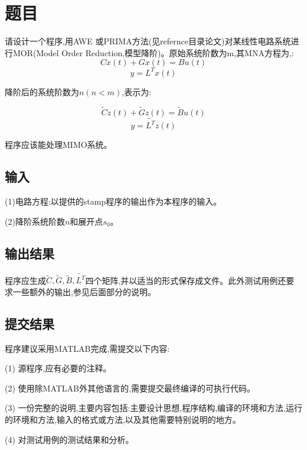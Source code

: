 \documentclass[12pt]{article}
\begin{document}
\begin{sloppypar}
\section{题目}
\qquad 请设计一个程序,用AWE 或PRIMA方法(见refernce目录论文)对某线性电路系统进行MOR(Model Order Reduction,模型降阶)。原始系统阶数为m,其MNA方程为,:
\begin{equation}
\label{MNA1}
C \dot{x}(t)+G x(t)=B u(t)
\end{equation}
\begin{equation}
  \label{MNA2}
y=L^T x(t) 
\end{equation}
 
\qquad 降阶后的系统阶数为$n(n < m)$,表示为:

\begin{equation}
  \label{MNA_reduced}
  \widetilde{C} \dot{z}(t)+ \widetilde{G} z(t) = \widetilde{B} u(t)
\end{equation}
\begin{equation}
  y=\widetilde{L^T} z(t) 
\end{equation}

\qquad 程序应该能处理MIMO系统。


\subsection{输入}
\qquad (1)电路方程:以提供的stamp程序的输出作为本程序的输入。 \par
\qquad (2)降阶系统阶数$n$和展开点$s_0$。 \par

\subsection{输出结果}
\qquad 程序应生成$\widetilde{C},\widetilde{G},\widetilde{B},\widetilde{L^T}$四个矩阵,并以适当的形式保存成文件。此外测试用例还要求一些额外的输出,参见后面部分的说明。\par

\subsection{提交结果}
\qquad 程序建议采用MATLAB完成,需提交以下内容: \par
\qquad (1) 源程序,应有必要的注释。 \par
\qquad (2) 使用除MATLAB外其他语言的,需要提交最终编译的可执行代码。 \par
\qquad (3) 一份完整的说明,主要内容包括:主要设计思想,程序结构,编译的环境和方法,运行的环境和方法,输入的格式或方法,以及其他需要特别说明的地方。 \par
\qquad (4) 对测试用例的测试结果和分析。 \par


\end{sloppypar}
\end{document}
